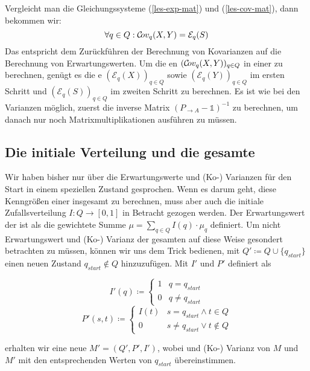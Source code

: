 \documentclass[a4paper]{article}
\theoremstyle{nonumberplain}
\begin{document}
 Vergleicht man die Gleichungssysteme (\ref{les-exp-mat}) und (\ref{les-cov-mat}), dann bekommen wir:
\begin{equation}
\forall q \in Q : \mathcal{C}\!ov_q(X,Y) = \mathcal{E}_q(S)
\end{equation}
Das entspricht dem Zurückführen der Berechnung von Kovarianzen auf die Berechnung von Erwartungswerten. Um die \cov{}en $(\mathcal{C}\!ov_q(X,Y))_{q\in Q}$ in einer \mc{} zu berechnen, genügt es die \expect{}e $(\mathcal{E}_q(X))_{q\in Q}$ sowie $(\mathcal{E}_q(Y))_{q\in Q}$ im ersten Schritt und $(\mathcal{E}_q(S))_{q\in Q}$ im zweiten Schritt zu berechnen. Es ist wie bei den Varianzen möglich, zuerst die inverse Matrix $(P_{\rightarrow A} - \mathbb{1})^{-1}$ zu berechnen, um danach nur noch Matrixmultiplikationen ausführen zu müssen.

\subsection{Die initiale Verteilung und die gesamte \mc{}}

Wir haben bisher nur über die Erwartungswerte und (Ko-) Varianzen für den Start in einem speziellen Zustand gesprochen. Wenn es darum geht, diese Kenngrößen einer \mc{} \mcex{} insgesamt zu berechnen, muss aber auch die initiale Zufallsverteilung $I : Q \to [0,1]$ in Betracht gezogen werden. Der Erwartungswert der \mc{} ist als die gewichtete Summe $\mu = \sum_{q\in Q}{I(q) \cdot \mu_q}$ definiert. Um nicht Erwartungswert und (Ko-) Varianz der gesamten \mc{} auf diese Weise gesondert betrachten zu müssen, können wir uns dem Trick bedienen, mit $Q' \coloneqq Q \cup \{q_{start}\}$ einen neuen Zustand $q_{start} \notin Q$ hinzuzufügen. Mit $I'$ und $P'$ definiert als
\begin{multicols}{2}
\noindent
\begin{equation*}
	I'(q) \coloneqq \begin{cases}
		1 & q = q_{start}\\
		0 & q \neq q_{start}
		
	\end{cases}
\end{equation*}
\begin{equation*}
	P'(s, t)  \coloneqq \begin{cases}
	I(t) & s = q_{start} \land t \in Q \\
	0 & s \neq q_{start} \lor t \notin Q
	\end{cases}
\end{equation*}
\end{multicols}
erhalten wir eine neue \mc{} $M'=(Q',P',I')$, wobei \expect{} und (Ko-) Varianz von $M$ und $M'$ mit den entsprechenden Werten von $q_{start}$ übereinstimmen.
\end{document}
